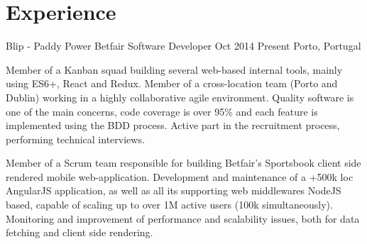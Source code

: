 \documentclass[]{andre-vechina-resume}
\begin{document}
\lastupdated


\section{Experience}

\begin{experience-item}
    {Blip - Paddy Power Betfair}
    {Software Developer}
    {Oct 2014}
    {Present}
    {Porto, Portugal}
    \begin{tightemize}
        \item
        Member of a Kanban squad building several web-based internal tools, mainly using ES6+, React and Redux.
        Member of a cross-location team (Porto and Dublin) working in a highly collaborative agile environment.
        Quality software is one of the main concerns, code coverage is over 95\% and each feature is implemented using the BDD process.
        Active part in the recruitment process, performing technical interviews.
        \item
        Member of a Scrum team responsible for building Betfair's Sportsbook client side rendered mobile web-application.
        Development and maintenance of a +500k loc AngularJS application, as well as all its supporting web middlewares NodeJS based, capable of scaling up to over 1M active users (100k simultaneously).
        Monitoring and improvement of performance and scalability issues, both for data fetching and client side rendering.
    \end{tightemize}

\end{experience-item}
\end{document}
